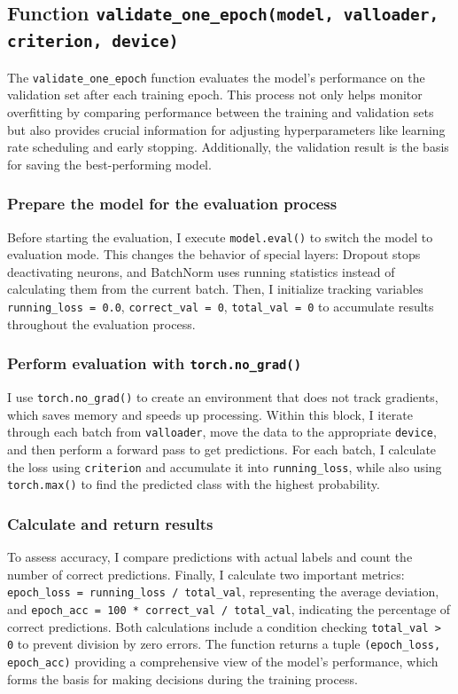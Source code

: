 \documentclass[12pt, a4paper, openany]{report}
\begin{document}
 \subsection{Function \texttt{validate\_one\_epoch(model, valloader, criterion, device)}} %
 The \texttt{validate\_one\_epoch} function evaluates the model's performance on the validation set after each training epoch. This process not only helps monitor overfitting by comparing performance between the training and validation sets but also provides crucial information for adjusting hyperparameters like learning rate scheduling and early stopping. Additionally, the validation result is the basis for saving the best-performing model.

 \subsubsection*{Prepare the model for the evaluation process} %
 Before starting the evaluation, I execute \texttt{model.eval()} to switch the model to evaluation mode. This changes the behavior of special layers: Dropout stops deactivating neurons, and BatchNorm uses running statistics instead of calculating them from the current batch. Then, I initialize tracking variables \texttt{running\_loss = 0.0}, \texttt{correct\_val = 0}, \texttt{total\_val = 0} to accumulate results throughout the evaluation process.

 \subsubsection*{Perform evaluation with \texttt{torch.no\_grad()}} %
 I use \texttt{torch.no\_grad()} to create an environment that does not track gradients, which saves memory and speeds up processing. Within this block, I iterate through each batch from \texttt{valloader}, move the data to the appropriate \texttt{device}, and then perform a forward pass to get predictions. For each batch, I calculate the loss using \texttt{criterion} and accumulate it into \texttt{running\_loss}, while also using \texttt{torch.max()} to find the predicted class with the highest probability.

 \subsubsection*{Calculate and return results} %
 To assess accuracy, I compare predictions with actual labels and count the number of correct predictions. Finally, I calculate two important metrics: \texttt{epoch\_loss = running\_loss / total\_val}, representing the average deviation, and \texttt{epoch\_acc = 100 * correct\_val / total\_val}, indicating the percentage of correct predictions. Both calculations include a condition checking \texttt{total\_val > 0} to prevent division by zero errors. The function returns a tuple \texttt{(epoch\_loss, epoch\_acc)} providing a comprehensive view of the model's performance, which forms the basis for making decisions during the training process.
\end{document}
